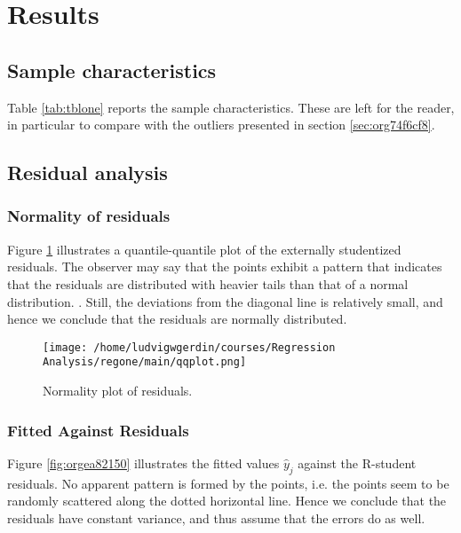 \documentclass[11pt]{article}
\begin{document}
\newpage
\section{Results}
\label{sec:org10f1da7}
\subsection{Sample characteristics}
\label{sec:org26e08b4}

Table \ref{tab:tblone} reports the sample characteristics. These are left for the reader, in particular to
compare with the outliers presented in section \ref{sec:org74f6cf8}.



\subsection{Residual analysis}
\label{sec:org73686f3}
\subsubsection{Normality of residuals}
\label{sec:orgf2c368d}

Figure \ref{fig:org7b63c6f} illustrates a quantile-quantile plot of the externally studentized residuals.
The observer may say that the points exhibit a pattern that indicates that the residuals are distributed with
heavier tails than that of a normal distribution. \cite{Montgomery2012}. Still, the deviations from the
diagonal line is relatively small, and hence we conclude that the residuals are normally distributed.

\begin{figure}[htbp]
\centering
\texttt{[image: /home/ludvigwgerdin/courses/Regression Analysis/regone/main/qqplot.png]}
\caption{\label{fig:org7b63c6f}
Normality plot of residuals.}
\end{figure}

\subsubsection{Fitted Against Residuals}
\label{sec:orge4979a0}

Figure \ref{fig:orgea82150} illustrates the fitted values \(\hat y_j\) against the R-student residuals. No apparent 
pattern is formed by the points, i.e. the points seem to be randomly scattered along the dotted horizontal
line. Hence we conclude that the residuals have constant variance, and thus assume that the errors do
as well.
\end{document}
